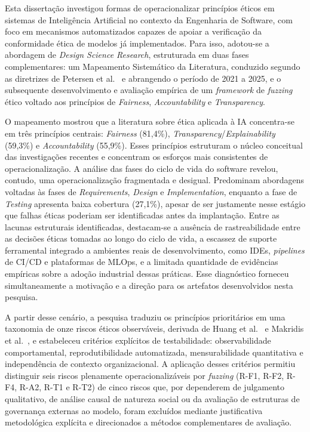 \label{cap:conclusao}

Esta dissertação investigou formas de operacionalizar princípios éticos em sistemas de Inteligência Artificial no contexto da Engenharia de Software, com foco em mecanismos automatizados capazes de apoiar a verificação da conformidade ética de modelos já implementados. Para isso, adotou-se a abordagem de \textit{Design Science Research}, estruturada em duas fases complementares: um Mapeamento Sistemático da Literatura, conduzido segundo as diretrizes de Petersen et al.~\cite{Petersen2015} e abrangendo o período de 2021 a 2025, e o subsequente desenvolvimento e avaliação empírica de um \textit{framework} de \textit{fuzzing} ético voltado aos princípios de \textit{Fairness}, \textit{Accountability} e \textit{Transparency}.

O mapeamento mostrou que a literatura sobre ética aplicada à IA concentra-se em três princípios centrais: \textit{Fairness} (81,4\%), \textit{Transparency}/\textit{Explainability} (59,3\%) e \textit{Accountability} (55,9\%). Esses princípios estruturam o núcleo conceitual das investigações recentes e concentram os esforços mais consistentes de operacionalização. A análise das fases do ciclo de vida do software revelou, contudo, uma operacionalização fragmentada e desigual. Predominam abordagens voltadas às fases de \textit{Requirements}, \textit{Design} e \textit{Implementation}, enquanto a fase de \textit{Testing} apresenta baixa cobertura (27,1\%), apesar de ser justamente nesse estágio que falhas éticas poderiam ser identificadas antes da implantação. Entre as lacunas estruturais identificadas, destacam-se a ausência de rastreabilidade entre as decisões éticas tomadas ao longo do ciclo de vida, a escassez de suporte ferramental integrado a ambientes reais de desenvolvimento, como IDEs, \textit{pipelines} de CI/CD e plataformas de MLOps, e a limitada quantidade de evidências empíricas sobre a adoção industrial dessas práticas. Esse diagnóstico forneceu simultaneamente a motivação e a direção para os artefatos desenvolvidos nesta pesquisa.

A partir desse cenário, a pesquisa traduziu os princípios prioritários em uma taxonomia de onze riscos éticos observáveis, derivada de Huang et al.~\cite{Huang2023} e Makridis et al.~\cite{Makridis2024}, e estabeleceu critérios explícitos de testabilidade: observabilidade comportamental, reprodutibilidade automatizada, mensurabilidade quantitativa e independência de contexto organizacional. A aplicação desses critérios permitiu distinguir seis riscos plenamente operacionalizáveis por \textit{fuzzing} (R-F1, R-F2, R-F4, R-A2, R-T1 e R-T2) de cinco riscos que, por dependerem de julgamento qualitativo, de análise causal de natureza social ou da avaliação de estruturas de governança externas ao modelo, foram excluídos mediante justificativa metodológica explícita e direcionados a métodos complementares de avaliação.

